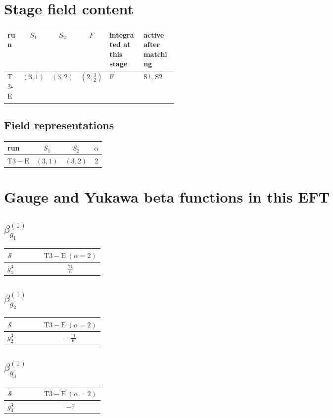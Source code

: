 \documentclass[9pt]{article}
\begin{document}
\section*{Stage field content}
\begin{longtable}{@{}lccc p{0.20\linewidth}p{0.20\linewidth}@{}}
\toprule
run & $S_1$ & $S_2$ & $F$ & integrated at this stage & active after matching \\
\midrule
T3-E & $(3,1)$ & $(3,2)$ & $(2,\frac{3}{2})$ & F & S1, S2 \\
\bottomrule
\end{longtable}
\subsection*{Field representations}
\begin{longtable}{@{}lccc@{}}
\toprule
run & $S_1$ & $S_2$ & $\alpha$ \\
\midrule
$\mathrm{T3-E}$ & $(3,1)$ & $(3,2)$ & $2$ \\
\bottomrule
\end{longtable}
\section*{Gauge and Yukawa beta functions in this EFT}
\subsection*{$ \beta_{g_1}^{(1)} $}
\begin{longtable}{@{}p{0.38\linewidth}c@{}}
\toprule
$\mathcal{S}$ & $ \mathrm{T3-E}\;(\alpha=2) $ \\
\midrule
$ g_1^3 $ & $ \frac{71}{6} $ \\
\bottomrule
\end{longtable}
\subsection*{$ \beta_{g_2}^{(1)} $}
\begin{longtable}{@{}p{0.38\linewidth}c@{}}
\toprule
$\mathcal{S}$ & $ \mathrm{T3-E}\;(\alpha=2) $ \\
\midrule
$ g_2^3 $ & $ - \frac{11}{6} $ \\
\bottomrule
\end{longtable}
\subsection*{$ \beta_{g_3}^{(1)} $}
\begin{longtable}{@{}p{0.38\linewidth}c@{}}
\toprule
$\mathcal{S}$ & $ \mathrm{T3-E}\;(\alpha=2) $ \\
\midrule
$ g_3^3 $ & $ -7 $ \\
\bottomrule
\end{longtable}
\end{document}
